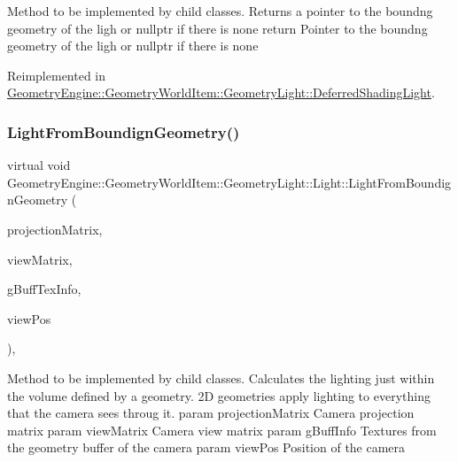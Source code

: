 Method to be implemented by child classes. Returns a pointer to the boundng geometry of the ligh or nullptr if there is none return Pointer to the boundng geometry of the ligh or nullptr if there is none 

Reimplemented in \mbox{\hyperlink{class_geometry_engine_1_1_geometry_world_item_1_1_geometry_light_1_1_deferred_shading_light_a742416954d3b05484799e4c1235567b1}{Geometry\+Engine\+::\+Geometry\+World\+Item\+::\+Geometry\+Light\+::\+Deferred\+Shading\+Light}}.

\mbox{\label{class_geometry_engine_1_1_geometry_world_item_1_1_geometry_light_1_1_light_a4dfee4fc27c75493f992a84c2ea3ff95}} 
\subsubsection{\texorpdfstring{LightFromBoundignGeometry()}{LightFromBoundignGeometry()}}
{\footnotesize\ttfamily virtual void Geometry\+Engine\+::\+Geometry\+World\+Item\+::\+Geometry\+Light\+::\+Light\+::\+Light\+From\+Boundign\+Geometry (\begin{DoxyParamCaption}\item[{const Q\+Matrix4x4 \&}]{projection\+Matrix,  }\item[{const Q\+Matrix4x4 \&}]{view\+Matrix,  }\item[{const \mbox{\hyperlink{class_geometry_engine_1_1_g_buffer_texture_info}{G\+Buffer\+Texture\+Info}} \&}]{g\+Buff\+Tex\+Info,  }\item[{const Q\+Vector3D \&}]{view\+Pos }\end{DoxyParamCaption})\hspace{0.3cm}{\ttfamily [inline]}, {\ttfamily [virtual]}}

Method to be implemented by child classes. Calculates the lighting just within the volume defined by a geometry. 2D geometries apply lighting to everything that the camera sees throug it. param projection\+Matrix Camera projection matrix param view\+Matrix Camera view matrix param g\+Buff\+Info Textures from the geometry buffer of the camera param view\+Pos Position of the camera 

